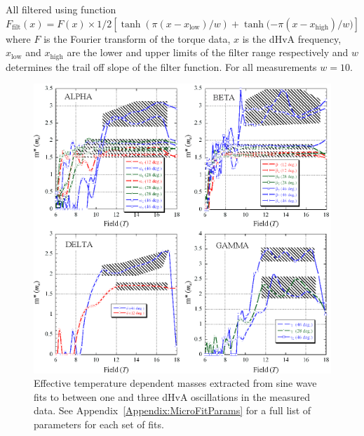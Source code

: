All filtered using function $\textit{F}_{\textrm{filt}}(x) = \textit{F}(x) \times 1/2 [\tanh{(\pi(x - x_{\textrm{low}})/w)} + \tanh{(-\pi(x - x_{\textrm{high}})/w})]$ where $\textit{F}$ is the Fourier transform of the torque data, $x$ is the dHvA frequency, $x_{\textrm{low}}$ and $x_{\textrm{high}}$ are the lower and upper limits of the filter range respectively and $w$ determines the trail off slope of the filter function. For all measurements $w=10$.
\begin{figure}[htbp]
    \begin{center}
        \includegraphics[scale=0.9]{Chapter-dHvABaFe2P2/Figures/Mass/MicroFits/MicroFits}
        \caption{Effective temperature dependent masses extracted from sine wave fits to between one and three dHvA oscillations in the measured data. See Appendix~\ref{Appendix:MicroFitParams} for a full list of parameters for each set of fits.}
        \label{Fig:ResD:MicroFits}
    \end{center}
\end{figure}
